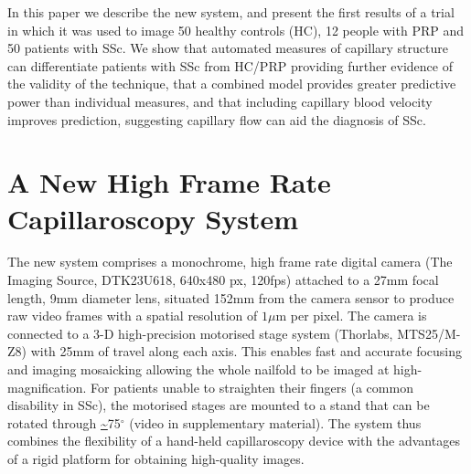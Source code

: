 \documentclass[runningheads,a4paper]{llncs}
\begin{document}
In this paper we describe the new system, and present the first results of a trial in which it was used to image 50 healthy controls (HC), 12 people with PRP and 50 patients with SSc. We show that automated measures of capillary structure can differentiate patients with SSc from HC/PRP providing further evidence of the validity of the technique, that a combined model provides greater predictive power than individual measures, and that including capillary blood velocity improves prediction, suggesting capillary flow can aid the diagnosis of SSc.
%
\section{A New High Frame Rate Capillaroscopy System}
\label{s:new_system}
%
The new system comprises a monochrome, high frame rate digital camera (The Imaging Source, DTK23U618, 640x480 px, 120fps) attached to a  27mm focal length, 9mm diameter lens, situated 152mm from the camera sensor to produce raw video frames with a spatial resolution of $1{\mu}$m per pixel. The camera is connected to a 3-D high-precision motorised stage system (Thorlabs, MTS25/M-Z8) with 25mm of travel along each axis. This enables fast and accurate focusing and imaging mosaicking allowing the whole nailfold to be imaged at high-magnification. For patients unable to straighten their fingers (a common disability in SSc), the motorised stages are mounted to a stand that can be rotated through \url{~}75$^{\circ}$ (video in supplementary material). The system thus combines the flexibility of a hand-held capillaroscopy device with the advantages of a rigid platform for obtaining high-quality images. 
%
\end{document}
